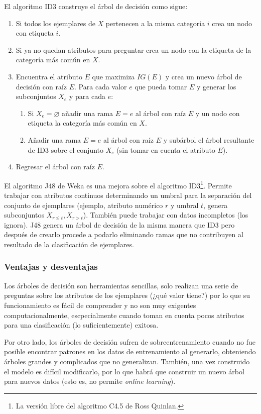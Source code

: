 \documentclass[spanish,11pt,letterpaper]{article}
\begin{document}
El algoritmo ID3 construye el árbol de decisión como sigue:
\begin{enumerate}
  \item Si todos los ejemplares de $X$ pertenecen a la misma categoría $i$ crea un nodo con etiqueta $i$.
  \item Si ya no quedan atributos para preguntar crea un nodo con la etiqueta de la categoría más común en $X$.
  \item Encuentra el atributo $E$ que maximiza $IG(E)$ y crea un nuevo árbol de decisión con raíz $E$. Para cada valor $e$ que pueda tomar $E$ y generar los subconjuntos $X_e$ y para cada $e$:
  \begin{enumerate}
    \item Si $X_e = \varnothing$ añadir una rama $E=e$ al árbol con raíz $E$ y un nodo con etiqueta la categoría más común en $X$.
    \item Añadir una rama $E=e$ al árbol con raíz $E$ y subárbol el árbol resultante de ID3 sobre el conjunto $X_e$ (sin tomar en cuenta el atributo $E$).
  \end{enumerate}
  \item Regresar el árbol con raíz $E$.
\end{enumerate}

El algoritmo J48 de Weka es una mejora sobre el algoritmo ID3\footnote{La versión libre del
algoritmo C4.5 de Ross Quinlan.}. Permite trabajar con atributos continuos determinando
un umbral para la separación del conjunto de ejemplares (ejemplo,
atributo numérico $r$ y umbral $t$, genera subconjuntos $X_{r\leq t},X_{r > t}$). También puede
trabajar con datos incompletos (los ignora). J48 genera un árbol de decisión de
la misma manera que ID3 pero después de crearlo procede a podarlo eliminando ramas
que no contribuyen al resultado de la clasificación de ejemplares.

\subsubsection{Ventajas y desventajas}

Los árboles de decisión son herramientas sencillas, solo realizan una serie de
preguntas sobre los atributos de los ejemplares (¿qué valor tiene?) por lo que
su funcionamiento es fácil de comprender y no son muy exigentes computacionalmente,
escpecialmente cuando toman en cuenta pocos atributos para una clasificación
(lo suficientemente) exitosa.

Por otro lado, los árboles de decisión sufren de sobreentrenamiento cuando no
fue posible encontrar patrones en los datos de entrenamiento al generarlo, obteniendo árboles
grandes y complicados que no generalizan. También, una vez construido el modelo
es difícil modificarlo, por lo que habrá que construir un nuevo árbol para nuevos
datos (esto es, no permite \textit{online learning}).
\end{document}
